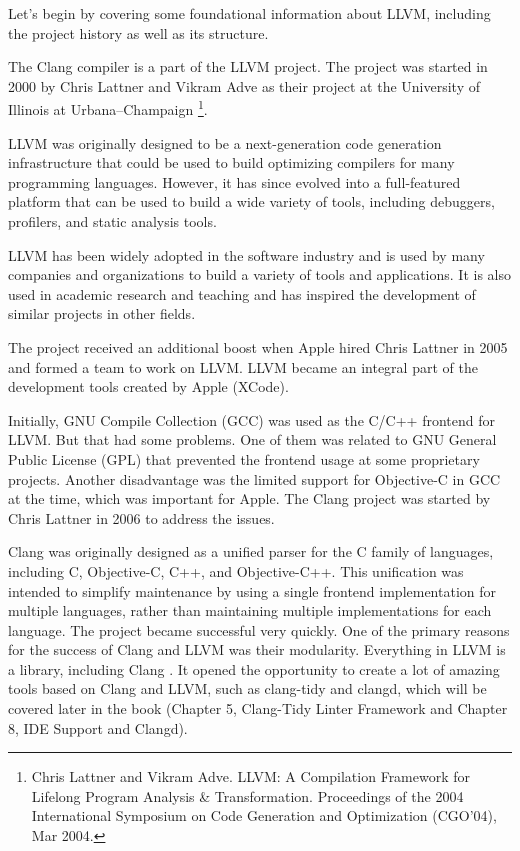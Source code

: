 Let's begin by covering some foundational information about LLVM, including the project history as well as its structure.




The Clang compiler is a part of the LLVM project. The project was started in 2000 by Chris Lattner and Vikram Adve as their project at the University of Illinois at Urbana–Champaign \footnote{Chris Lattner and Vikram Adve. LLVM: A Compilation Framework for Lifelong Program Analysis \& Transformation. Proceedings of the 2004 International Symposium on Code Generation and Optimization (CGO'04), Mar 2004.}.

LLVM was originally designed to be a next-generation code generation infrastructure that could be used to build optimizing compilers for many programming languages. However, it has since evolved into a full-featured platform that can be used to build a wide variety of tools, including debuggers, profilers, and static analysis tools.

LLVM has been widely adopted in the software industry and is used by many companies and organizations to build a variety of tools and applications. It is also used in academic research and teaching and has inspired the development of similar projects in other fields.

The project received an additional boost when Apple hired Chris Lattner in 2005 and formed a team to work on LLVM. LLVM became an integral part of the development tools created by Apple (XCode).

Initially, GNU Compile Collection (GCC) was used as the C/C++ frontend for LLVM. But that had some problems. One of them was related to GNU General Public License (GPL) that prevented the frontend usage at some proprietary projects. Another disadvantage was the limited support for Objective-C in GCC at the time, which was important for Apple. The Clang project was started by Chris Lattner in 2006 to address the issues.

Clang was originally designed as a unified parser for the C family of languages, including C, Objective-C, C++, and Objective-C++. This unification was intended to simplify maintenance by using a single frontend implementation for multiple languages, rather than maintaining multiple implementations for each language. The project became successful very quickly. One of the primary reasons for the success of Clang and LLVM was their modularity. Everything in LLVM is a library, including Clang . It opened the opportunity to create a lot of amazing tools based on Clang and LLVM, such as clang-tidy and clangd, which will be covered later in the book (Chapter 5, Clang-Tidy Linter Framework and Chapter 8, IDE Support and Clangd).

